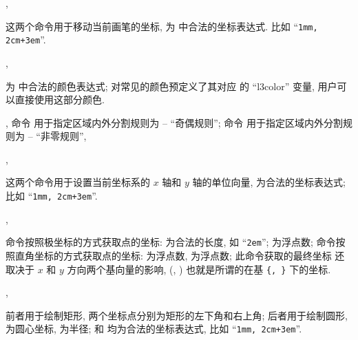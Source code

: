 \documentclass[
  hyper, 
  lang = cn, 
  class = l3doc,
  classOption={11pt},
  sect = {load=false},
]{../../zlatex/code/ztex}
\begin{document}
\begin{function}[added=2025-05-15]{\zmoveto, \zlineto}
  \begin{syntax}
  \end{syntax}
  这两个命令用于移动当前画笔的坐标,  为  中合法的坐标表达式.
  比如 ``\texttt{1mm, 2cm+3em}''.
\end{function}


\begin{function}[added=2025-05-15]{\zscolor, \zfcolor}
  \begin{syntax}
  \end{syntax}
   为  中合法的颜色表达式; \ztikz{} 对常见的颜色预定义了其对应
  的 ``l3color'' 变量, 用户可以直接使用这部分颜色.
\end{function}


\begin{function}[added=2025-05-31]{\zfevenodd, \zfnozero}
  命令  用于指定区域内外分割规则为 -- ``奇偶规则'';
  命令  用于指定区域内外分割规则为 -- ``非零规则'', 
\end{function}


\begin{function}[added=2025-05-15]{\zxvec, \zyvec}
  \begin{syntax}
  \end{syntax}
  这两个命令用于设置当前坐标系的 $x$ 轴和 $y$ 轴的单位向量,  为合法的坐标表达式;
  比如 ``\texttt{1mm, 2cm+3em}''.
\end{function}


\begin{function}[added=2025-05-15]{\zpolar, \zcoor}
  \begin{syntax}
  \end{syntax}
   命令按照极坐标的方式获取点的坐标: 为合法的长度, 如 ``\texttt{2em}'';  为浮点数; 
   命令按照直角坐标的方式获取点的坐标:  为浮点数,  为浮点数; 此命令获取的最终坐标
  还取决于 $x$ 和 $y$ 方向两个基向量的影响, (, ) 也就是所谓的在基 \texttt{\{, \}} 
  下的坐标.
\end{function}


\begin{function}[added=2025-05-15]{\zrect, \zcirc}
  \begin{syntax}
  \end{syntax}
  前者用于绘制矩形, 两个坐标点分别为矩形的左下角和右上角; 后者用于绘制圆形,  为圆心坐标,  为半径;
   和  均为合法的坐标表达式, 比如 ``\texttt{1mm, 2cm+3em}''.
\end{function}
\end{document}
